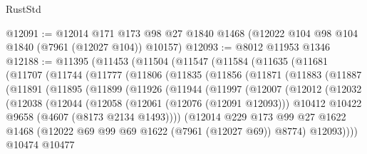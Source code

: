 \begin{lexlean}{RustStd}
\begin{coremodule}
@12091 := @12014
    @171
    @173
    @98
    @27
    @1840
    @1468
    (@12022 @104 @98 @104 @1840 (@7961 (@12027 @104)) @10157)
@12093 := @8012 @11953 @1346
@12188 := @11395
    (@11453
      (@11504
        (@11547
          (@11584
            (@11635
              (@11681
                (@11707
                  (@11744
                    (@11777
                      (@11806
                        (@11835
                          (@11856
                            (@11871
                              (@11883
                                (@11887
                                  (@11891
                                    (@11895
                                      (@11899
                                        (@11926
                                          (@11944
                                            (@11997
                                              (@12007
                                                (@12012
                                                  (@12032
                                                    (@12038
                                                      (@12044
                                                        (@12058
                                                          (@12061 (@12076 (@12091 @12093)))
                                                          @10412
                                                          @10422
                                                          @9658
                                                          (@4607 (@8173 @2134 @1493))))
                                                      (@12014
                                                        @229
                                                        @173
                                                        @99
                                                        @27
                                                        @1622
                                                        @1468
                                                        (@12022
                                                          @69
                                                          @99
                                                          @69
                                                          @1622
                                                          (@7961 (@12027 @69))
                                                          @8774)
                                                        @12093))))
                                                @10474
                                                @10477

\end{coremodule}
\end{lexlean}
